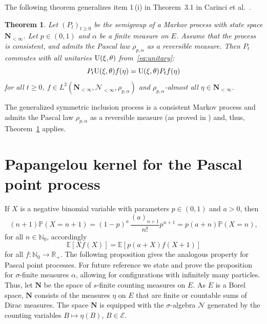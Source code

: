\documentclass[11pt]{article}
\numberwithin{equation}{section}
\numberwithin{equation}{section}
\newtheorem{Theorem}{Theorem}[section]
\newcommand{\N}{\mathbb{N}}
\newcommand{\R}{\mathbb{R}}
\renewcommand{\P}{\mathbb{P}}
\newcommand{\E}{\mathbb{E}}
\newcommand{\1}{\mathbbm{1}}
\begin{document}
The following theorem generalizes item 1\,(i) in Theorem~3.1 in Carinci et al.~\cite{carinci2019orthogonal}.

\begin{Theorem} \label{thm:symmetry}
Let $(P_t)_{t\geq 0}$ be the semigroup of a Markov process with state space $\mathbf N_{<\infty}$. Let $p\in (0,1)$ and $\alpha$ be a finite measure on $E$. Assume that the process is consistent, and admits the Pascal law $\rho_{p,\alpha}$ as a reversible measure. Then $P_t$ commutes with all unitaries ${\rm U}(\xi,\theta)$ from~\eqref{eq:unitary}:
	\[
		P_t {\rm U}(\xi,\theta) f(\eta) = {\rm U}(\xi,\theta) P_t f (\eta)
	\]
	for all $t\geq 0$, $f\in L^2(\mathbf N_{<\infty},\mathcal N_{<\infty},\rho_{p,\alpha})$ and $\rho_{p,\alpha}$-almost all $\eta\in \mathbf N_{<\infty}$.
\end{Theorem}

The generalized symmetric inclusion process is a consistent Markov process and admits the Pascal law $\rho_{p,\alpha}$ as a reversible measure (as proved in \cite[Theorem~5.2.]{IntertwiningConsistent}) and, thus, Theorem~\ref{thm:symmetry} applies.

\setcounter{section}{2}
\section{Papangelou kernel for the Pascal point process} \label{sec:pascal}


If $X$ is a negative binomial variable with parameters $p\in (0,1)$ and $a>0$, then
\[
 (n+1)\P( X = n+1) = (1-p)^a\, \frac{(a)_{n+1}}{n!} p^{n+1} = p (a+n)\P( X = n),
\]
for all $n\in \N_0$, accordingly
\[
	\E[ X f(X)] = \E[ p(a+X) f(X+1)]
\]
for all $f\colon \N_0\to \R_+$. The following proposition gives the analogous property for Pascal point processes. For future reference we state and prove the proposition for $\sigma$-finite measures $\alpha$, allowing for configurations with infinitely many particles. Thus, let $\mathbf N$ be the space of $s$-finite counting measures on $E$. As $E$ is a Borel space, $\mathbf N$ consists of the measures $\eta$ on $E$ that are finite or countable sums of Dirac measures. The space $\mathbf N$ is equipped with the $\sigma$-algebra $\mathcal N$ generated by the counting variables $B\mapsto \eta(B)$, $B\in \mathcal E$.
\end{document}
